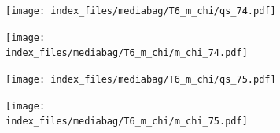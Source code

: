 \documentclass[
  11pt,
  letterpaper,
]{scrreprt}
\begin{document}
\begin{figure}

\begin{minipage}{0.50\linewidth}

\begin{figure}[H]

{\centering \texttt{[image: index\_files/mediabag/T6\_m\_chi/qs\_74.pdf]}

}


\end{figure}%

\end{minipage}%
%
\begin{minipage}{0.50\linewidth}

\begin{figure}[H]

{\centering \texttt{[image: index\_files/mediabag/T6\_m\_chi/m\_chi\_74.pdf]}

}


\end{figure}%

\end{minipage}%

\end{figure}%

\begin{figure}

\begin{minipage}{0.50\linewidth}

\begin{figure}[H]

{\centering \texttt{[image: index\_files/mediabag/T6\_m\_chi/qs\_75.pdf]}

}


\end{figure}%

\end{minipage}%
%
\begin{minipage}{0.50\linewidth}

\begin{figure}[H]

{\centering \texttt{[image: index\_files/mediabag/T6\_m\_chi/m\_chi\_75.pdf]}

}


\end{figure}%

\end{minipage}%

\end{figure}%
\end{document}

